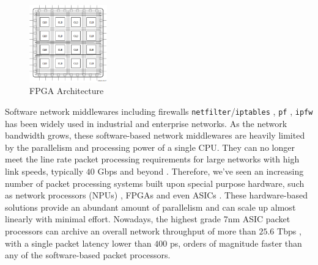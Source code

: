 \documentclass[a4paper]{report}
\newcommand{\code}{\texttt}
\begin{document}
\begin{figure}[h!]
  \centering
  \includegraphics[width=0.3\textwidth]{docs/report/imgs/fpga-arch.png}
  \caption{FPGA Architecture \cite{xilinx-fpga}}
  \label{fig:fpga-arch}
\end{figure}

Software network middlewares including firewalls \code{netfilter}/\code{iptables} \cite{netfilter-iptables}, \code{pf} \cite{pf}, \code{ipfw} \cite{ipfw} has been widely used in industrial and enterprise networks. As the network bandwidth grows, these software-based network middlewares are heavily limited by the parallelism and processing power of a single CPU. They can no longer meet the line rate packet processing requirements for large networks with high link speeds, typically $40$ Gbps and beyond \cite{fiessler-2016}. Therefore, we've seen an increasing number of packet processing systems built upon special purpose hardware, such as network processors (NPUs) \cite {qi-2007, duo-2006}, FPGAs\cite{hager-2014, fong-2012, jiang-2009, jiang-2009-large} and even ASICs \cite{bosshart-2013}. These hardware-based solutions provide an abundant amount of parallelism and can scale up almost linearly with minimal effort. Nowadays, the highest grade 7nm ASIC packet processors can archive an overall network throughput of more than $25.6$ Tbps \cite{tomahawk-2021}, with a single packet latency lower than $400$ ps, orders of magnitude faster than any of the software-based packet processors.
\end{document}
